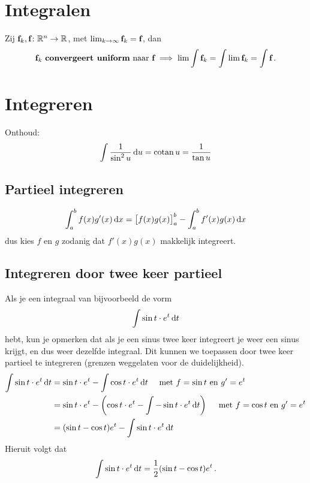 \documentclass{article}
\begin{document}
 	\section{Integralen}
	 	\begin{stelling}
		 	Zij ${\textbf{f}}_k,{\textbf{f}} \colon \mathbb{R}^n \to \mathbb{R}$, met $\lim_{k \to \infty} {\textbf{f}}_k = {\textbf{f}}$, dan
		 	\[ {\textbf{f}}_k \text { \textbf{convergeert uniform} naar } {\textbf{f}} \implies \lim \int {\textbf{f}}_k = \int \lim {\textbf{f}}_k = \int {\textbf{f}} \,. \]
	 	\end{stelling}
	 	
	\section{Integreren}
        Onthoud:
        \begin{align*}
            \int \frac{1}{\sin^2 u} \mathop{}\!\mathrm{d} u = \operatorname{\mathop{cotan}} u = \frac{1}{\tan u}
        \end{align*}
        \subsection{Partieel integreren}
            \[
                \int_a^b f(x) g'(x) \mathop{}\!\mathrm{d} x = \big[f(x)g(x)\big]_a^b - \int_a^b f'(x) g(x) \mathop{}\!\mathrm{d} x
             \]
             dus kies $f$ en $g$ zodanig dat $f'(x)g(x)$ makkelijk integreert.

        \subsection{Integreren door twee keer partieel}
            Als je een integraal van bijvoorbeeld de vorm
            \[
                \int \sin t \cdot e^t \mathop{}\!\mathrm{d} t
            \]
            hebt, kun je opmerken dat als je een sinus twee keer integreert je weer een sinus
            krijgt, en dus weer dezelfde integraal. Dit kunnen we toepassen
            door twee keer partieel te integreren (grenzen weggelaten voor de duidelijkheid).
            \begin{align*}
                \int \sin t \cdot e^t \mathop{}\!\mathrm{d} t &= \sin t \cdot e^t - \int \cos t \cdot e^t \mathop{}\!\mathrm{d} t
                \quad \text{ met $f=\sin t$ en $g'=e^t$} \\
                &= \sin t \cdot e^t - \left( \cos t \cdot e^t - \int - \sin t \cdot e^t \mathop{}\!\mathrm{d} t \right)
                \quad \text{ met $f=\cos t$ en $g'=e^t$} \\
                &= ( \sin t - \cos t ) e^t -  \int \sin t \cdot e^t \mathop{}\!\mathrm{d} t
            \end{align*}
            Hieruit volgt dat
            \[  \int \sin t \cdot e^t \mathop{}\!\mathrm{d} t = \frac{1}{2} ( \sin t - \cos t ) e^t\,. \]
\end{document}

